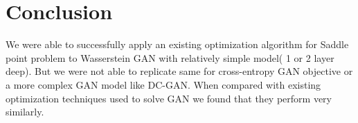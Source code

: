 \documentclass{article}
\begin{document}
\section{Conclusion}
We were able to successfully apply an existing optimization algorithm for Saddle point problem to Wasserstein GAN with relatively simple model( 1 or 2 layer deep). But we were not able to replicate same for cross-entropy GAN objective or a more complex GAN model like DC-GAN. When compared with existing optimization techniques used to solve GAN we found that they perform very similarly. 


\end{document}
